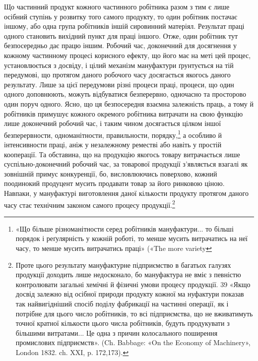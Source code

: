 Що частинний продукт кожного частинного робітника разом
з тим є лише осібний ступінь у розвитку того самого продукту,
то один робітник постачає іншому, або одна група робітників
іншій сировинний матеріял. Результат праці одного становить
вихідний пункт для праці іншого. Отже, один робітник тут безпосередньо
дає працю іншим. Робочий час, доконечний для
досягнення у кожному частинному процесі корисного ефекту,
що його має на меті цей процес, установлюється з досвіду, і цілий
механізм мануфактури ґрунтується на тій передумові, що протягом
даного робочого часу досягається якогось даного результату.
Лише за цієї передумови різні процеси праці, процеси, що
один одного доповнюють, можуть відбуватися безперервно,
одночасно та просторово один поруч одного. Ясно, що ця безпосередня
взаємна залежність праць, а тому й робітників примушує
кожного окремого робітника витрачати на свою функцію лише
доконечний робочий час, і таким чином досягається цілком іншої
безперервности, одноманітности, правильности, порядку,\footnote{
«Що більше різноманітности серед робітників мануфактури... то
більші порядок і реґулярність у кожній роботі, то менше мусить витрачатись
на неї часу, то менше мусить витрачатись праці» («The more variety
} а особливо
й інтенсивности праці, аніж у незалежному реместві або
навіть у простій кооперації. Та обставина, що на продукцію
якогось товару витрачається лише суспільно-доконечний робочий
час, за товарової продукції з’являється взагалі як зовнішній
примус конкуренції, бо, висловлюючись поверхово, кожний
поодинокий продуцент мусить продавати товар за його ринковою
ціною. Навпаки, у мануфактурі виготовлення даної кількости
продукту протягом даного часу стає технічним законом самого
процесу продукції.\footnote{
Проте цього результату мануфактурне підприємство в багатьох
галузях продукції доходить лише недосконало, бо мануфактура не вміє
з певністю контролювати загальні хемічні й фізичні умови процесу продукції.
39 «Якщо досвід залежно від осібної природи продукту кожної ма
нуфактури показав так найвигідніший спосіб поділу фабрикації на
частинні операції, як і потрібне для цього число робітників, то всі підприємства,
що не вживатимуть точної кратної кількости цього числа
робітників, будуть продукувати з більшими витратами... Це одна з
причин колосального поширення промислових підприємств». (Ch. Babbage:
«On the Economy of Machinery», London 1832. ch. XXI, p. 172,173).
}

